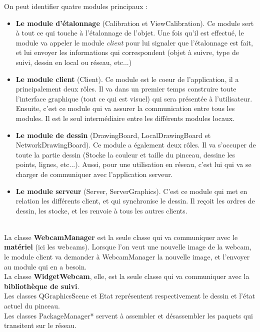 \documentclass{report}
\begin{document}
				On peut identifier quatre modules principaux : \\
				\begin{itemize}
					\item \textbf{Le module d'étalonnage} (Calibration et ViewCalibration). Ce module sert à tout ce qui touche à l'étalonnage de l'objet. Une fois qu'il est effectué, le module va appeler le module \textit{client} pour lui signaler que l'étalonnage est fait, et lui envoyer les informations qui correspondent (objet à suivre, type de suivi, dessin en local ou réseau, etc...)
					\item \textbf{Le module client} (Client). Ce module est le coeur de l'application, il a principalement deux rôles. Il va dans un premier temps construire toute l'interface graphique (tout ce qui est visuel) qui sera présentée à l'utilisateur. Ensuite, c'est ce module qui va assurer la communication entre tous les modules. Il est le seul intermédiaire entre les différents modules locaux.
					\item \textbf{Le module de dessin} (DrawingBoard, LocalDrawingBoard et NetworkDrawingBoard). Ce module a également deux rôles. Il va s'occuper de toute la partie dessin (Stocke la couleur et taille du pinceau, dessine les points, lignes, etc...). Aussi, pour une utilisation en réseau, c'est lui qui va se charger de communiquer avec l'application serveur.
					\item \textbf{Le module serveur} (Server, ServerGraphics). C'est ce module qui met en relation les différents client, et qui synchronise le dessin. Il reçoit les ordres de dessin, les stocke, et les renvoie à tous les autres clients.
				\end{itemize}
				\ \\
				La classe \textbf{WebcamManager} est la seule classe qui va communiquer avec le \textbf{matériel} (ici les webcams). Lorsque l'on veut une nouvelle image de la webcam, le module client va demander à WebcamManager la nouvelle image, et l'envoyer au module qui en a besoin. \\
				La classe \textbf{WidgetWebcam}, elle, est la seule classe qui va communiquer avec la \textbf{bibliothèque de suivi}. \\
				Les classes QGraphicsScene et Etat représentent respectivement le dessin et l'état actuel du pinceau. \\
				Les classes PackageManager* servent à assembler et désassembler les paquets qui transitent sur le réseau.
				
\end{document}
